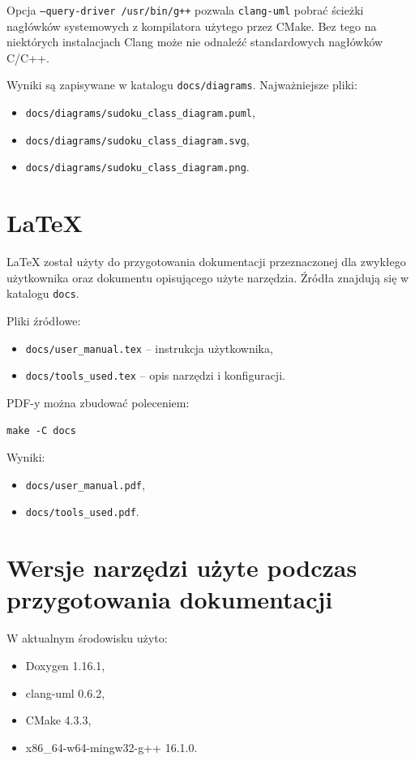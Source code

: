 \documentclass[12pt,a4paper]{article}
\begin{document}
Opcja \texttt{--query-driver /usr/bin/g++} pozwala \texttt{clang-uml} pobrać
ścieżki nagłówków systemowych z kompilatora użytego przez CMake. Bez tego na
niektórych instalacjach Clang może nie odnaleźć standardowych nagłówków C/C++.

Wyniki są zapisywane w katalogu \texttt{docs/diagrams}. Najważniejsze pliki:
\begin{itemize}[noitemsep]
    \item \texttt{docs/diagrams/sudoku\_class\_diagram.puml},
    \item \texttt{docs/diagrams/sudoku\_class\_diagram.svg},
    \item \texttt{docs/diagrams/sudoku\_class\_diagram.png}.
\end{itemize}

\section{LaTeX}

LaTeX został użyty do przygotowania dokumentacji przeznaczonej dla zwykłego
użytkownika oraz dokumentu opisującego użyte narzędzia. Źródła znajdują się w
katalogu \texttt{docs}.

Pliki źródłowe:
\begin{itemize}[noitemsep]
    \item \texttt{docs/user\_manual.tex} -- instrukcja użytkownika,
    \item \texttt{docs/tools\_used.tex} -- opis narzędzi i konfiguracji.
\end{itemize}

PDF-y można zbudować poleceniem:

\begin{lstlisting}
make -C docs
\end{lstlisting}

Wyniki:
\begin{itemize}[noitemsep]
    \item \texttt{docs/user\_manual.pdf},
    \item \texttt{docs/tools\_used.pdf}.
\end{itemize}

\section{Wersje narzędzi użyte podczas przygotowania dokumentacji}

W aktualnym środowisku użyto:
\begin{itemize}[noitemsep]
    \item Doxygen 1.16.1,
    \item clang-uml 0.6.2,
    \item CMake 4.3.3,
    \item x86\_64-w64-mingw32-g++ 16.1.0.
\end{itemize}
\end{document}
